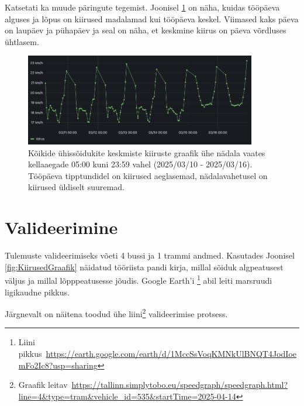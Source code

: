 Katsetati ka muude päringute tegemist. Joonisel \ref{fig:nadalaKeskmine} on näha, kuidas tööpäeva alguses ja lõpus on kiirused madalamad kui tööpäeva keskel. Viimased kaks päeva on laupäev ja pühapäev ja seal on näha, et keskmine kiirus on päeva võrdluses ühtlasem. 
\begin{figure}[H]
    \centering
    \includegraphics[width=0.9\textwidth]{figures/Kiirused5toopaeva2puhke.png}
    \caption{Kõikide ühissõidukite keskmiste kiiruste graafik ühe nädala vaates kellaaegade 05:00 kuni 23:59 vahel (2025/03/10 - 2025/03/16). Tööpäeva tipptundidel on kiirused aeglasemad, nädalavahetusel on kiirused üldiselt suuremad.}
    \label{fig:nadalaKeskmine}
\end{figure}





\section{Valideerimine}\label{section:valideerimine}

Tulemuste valideerimiseks võeti 4 bussi ja 1 trammi andmed. Kasutades Joonisel \ref{fig:KiirusedGraafik} näidatud tööriista pandi kirja, millal sõiduk algpeatusest väljus ja millal lõpppeatusesse jõudis. Google Earth'i \footnote{Liini pikkus~\url{https://earth.google.com/earth/d/1MccSsVoqKMNkUlBNQT4JodIoemFo2Ic8?usp=sharing}} abil leiti marsruudi ligikaudne pikkus.

Järgnevalt on näitena toodud ühe liini\footnote{Graafik leitav~\url{https://tallinn.simplytobo.eu/speedgraph/speedgraph.html?line=4&type=tram&vehicle_id=535&startTime=2025-04-14}} valideerimise protsess. 

